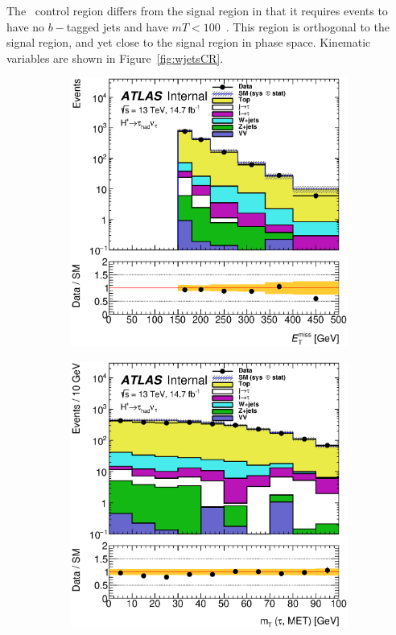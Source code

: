 \par The \Wjets\ control region differs from the signal region in that it requires events 
to have no $b-$tagged jets and have $mT<100$~\GeV. This region is orthogonal to the signal 
region, and yet close to the signal region in phase space. Kinematic variables are shown in 
Figure~\ref{fig:wjetsCR}.  

\begin{figure}[!h]
\begin{subfigure}{0.5\textwidth}
   \includegraphics[width=\textwidth]{figures/met_TTBar.eps}
\caption{\met}
\end{subfigure} %
\begin{subfigure}{0.5\textwidth}
   \includegraphics[width=\textwidth]{figures/mT_TTBar.eps}

\end{subfigure}
\end{figure}
